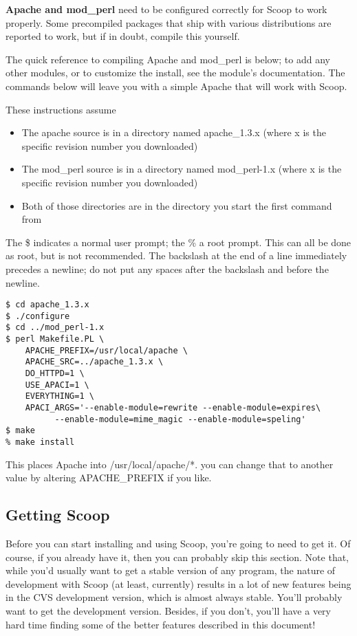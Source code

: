 {\bf Apache and mod\_perl} need to be configured correctly for Scoop to work properly.  Some precompiled packages that ship with various distributions are reported to work, but if in doubt, compile this yourself.

The quick reference to compiling Apache and mod\_perl is below; to add any other modules, or to customize the install, see the module's documentation.  The commands below will leave you with a simple Apache that will work with Scoop.

These instructions assume
\begin{itemize}
\item The apache source is in a directory named apache\_1.3.x (where x is the specific revision number you downloaded)
\item The mod\_perl source is in a directory named mod\_perl-1.x (where x is the specific revision number you downloaded)
\item Both of those directories are in the directory you start the first command from
\end{itemize}

The \$ indicates a normal user prompt; the \% a root prompt.  This can all be done as root, but is not recommended.  The backslash at the end of a line immediately precedes a newline; do not put any spaces after the backslash and before the newline.

\begin{verbatim}
$ cd apache_1.3.x
$ ./configure
$ cd ../mod_perl-1.x
$ perl Makefile.PL \
    APACHE_PREFIX=/usr/local/apache \
    APACHE_SRC=../apache_1.3.x \
    DO_HTTPD=1 \
    USE_APACI=1 \
    EVERYTHING=1 \
    APACI_ARGS='--enable-module=rewrite --enable-module=expires\
          --enable-module=mime_magic --enable-module=speling'
$ make
% make install
\end{verbatim}

This places Apache into /usr/local/apache/*. you can change that to another value by altering APACHE\_PREFIX if you like.

\subsection{Getting Scoop}

Before you can start installing and using Scoop, you're going to need to get it. Of course, if you already have it, then you can probably skip this section. Note that, while you'd usually want to get a stable version of any program, the nature of development with Scoop (at least, currently) results in a lot of new features being in the CVS development version, which is almost always stable. You'll probably want to get the development version.  Besides, if you don't, you'll have a very hard time finding some of the better features described in this document!

